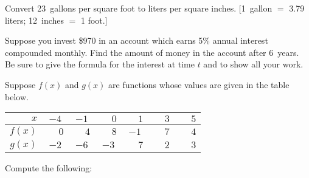 \documentclass[12pt,letterpaper]{exam}
\begin{document}
\begin{questions}
\newpage
\question[6] Convert 23~gallons per square foot to liters per square inches. [1~gallon $=$ 3.79 liters; 12~inches $=$ 1 foot.] \pspace





\newpage
\question[6] Suppose you invest \$970 in an account which earns 5\% annual interest compounded monthly. Find the amount of money in the account after 6~years. Be sure to give the formula for the interest at time $t$ and to show all your work. \pspace





\newpage
\question[10] Suppose $f(x)$ and $g(x)$ are functions whose values are given in the table below.
	\begin{table}[!ht]
	\centering
	\begin{tabular}{|r||c|c|c|c|c|c|} \hline
	$x$ & $-4$ & $-1$ & $\phantom{-}0$ & $\phantom{-}1$ & $\phantom{-}3$ & $\phantom{-}5$ \\ \hline
	$f(x)$ & $\phantom{-}0$ & $\phantom{-}4$ & $\phantom{-}8$ & $-1$ & $\phantom{-}7$ & $\phantom{-}4$ \\ \hline
	$g(x)$ & $-2$ & $-6$ & $-3$ & $\phantom{-}7$ & $\phantom{-}2$ & $\phantom{-}3$ \\ \hline
	\end{tabular}
	\end{table} \par
Compute the following: \pspace


\end{questions}
\end{document}
